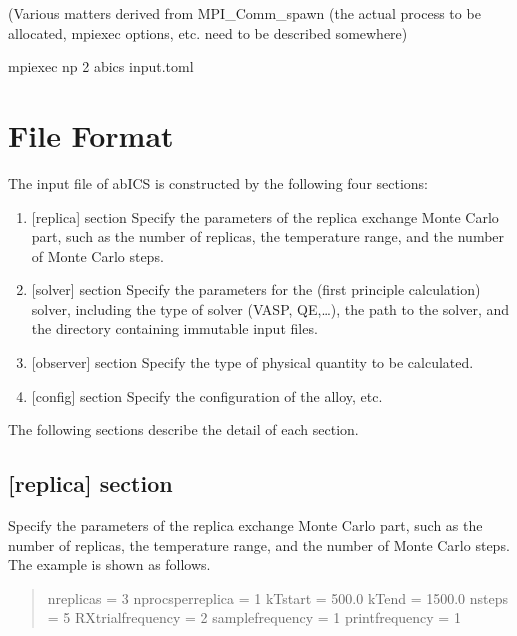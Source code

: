 \documentclass[letterpaper,10pt,english]{sphinxmanual}
\begin{document}
(Various matters derived from MPI\_Comm\_spawn (the actual process to be allocated, mpiexec options, etc. need to be described somewhere)

\begin{sphinxVerbatim}[commandchars=\\\{\}]
\PYGZdl{} mpiexec \PYGZhy{}np 2 abics input.toml
\end{sphinxVerbatim}


\chapter{File Format}
\label{\detokenize{file_specification/index:file-format}}\label{\detokenize{file_specification/index::doc}}
The input file of abICS is constructed by the following four sections:
\begin{enumerate}
\item {} 
{[}replica{]} section
Specify the parameters of the replica exchange Monte Carlo part, such as the number of replicas, the temperature range, and the number of Monte Carlo steps.

\item {} 
{[}solver{]} section
Specify the parameters for the (first principle calculation) solver, including the type of solver (VASP, QE,…), the path to the solver, and the directory containing immutable input files.

\item {} 
{[}observer{]} section
Specify the type of physical quantity to be calculated.

\item {} 
{[}config{]} section
Specify the configuration of the alloy, etc.

\end{enumerate}

The following sections describe the detail of each section.


\section{{[}replica{]} section}
\label{\detokenize{file_specification/parameter_replica::doc}}\label{\detokenize{file_specification/parameter_replica:replica-section}}
Specify the parameters of the replica exchange Monte Carlo part, such as the number of replicas, the temperature range, and the number of Monte Carlo steps.
The example is shown as follows.
\begin{quote}

\begin{sphinxVerbatim}[commandchars=\\\{\}]
[replica]
nreplicas = 3
nprocs\PYGZus{}per\PYGZus{}replica = 1
kTstart = 500.0
kTend = 1500.0
nsteps = 5
RXtrial\PYGZus{}frequency = 2
sample\PYGZus{}frequency = 1
print\PYGZus{}frequency = 1
\end{sphinxVerbatim}
\end{quote}
\end{document}
